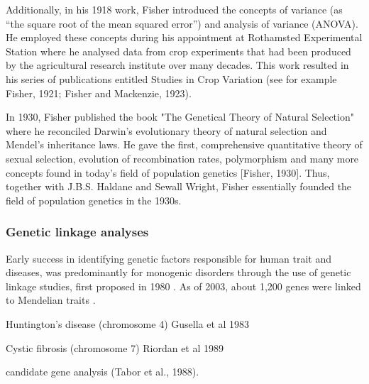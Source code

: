 Additionally, in his 1918 work, Fisher introduced the concepts of variance (as “the square root of the mean squared error”) and analysis of variance (ANOVA). 
He employed these concepts during his appointment at Rothamsted Experimental Station where he analysed data from crop experiments that had been produced by the agricultural research institute over many decades.
This work resulted in his series of publications entitled Studies in Crop Variation (see for example Fisher, 1921; Fisher and Mackenzie, 1923). 

In 1930, Fisher published the book "The Genetical Theory of Natural Selection" where he reconciled Darwin’s evolutionary theory of natural selection and Mendel’s inheritance laws. 
He gave the first, comprehensive quantitative theory of sexual selection, evolution of recombination rates, polymorphism and many more concepts found in today’s field of population genetics [Fisher, 1930]. 
Thus, together with J.B.S. Haldane and Sewall Wright, Fisher essentially founded the field of population genetics in the 1930s.\\


\subsubsection{Genetic linkage analyses}

Early success in identifying genetic factors responsible for human trait and diseases, was predominantly for monogenic disorders through the use of genetic linkage studies, first proposed in 1980 \cite{botstein1980construction, botstein2003discovering}.
As of 2003, about 1,200 genes were linked to Mendelian
traits \cite{botstein2003discovering}.

Huntington's disease (chromosome 4)
Gusella et al 1983\cite{gusella1983polymorphic}

Cystic fibrosis (chromosome 7)
Riordan et al 1989 \cite{riordan1989identification}

candidate gene analysis (Tabor et al., 1988). \cite{tabor2002candidate}

